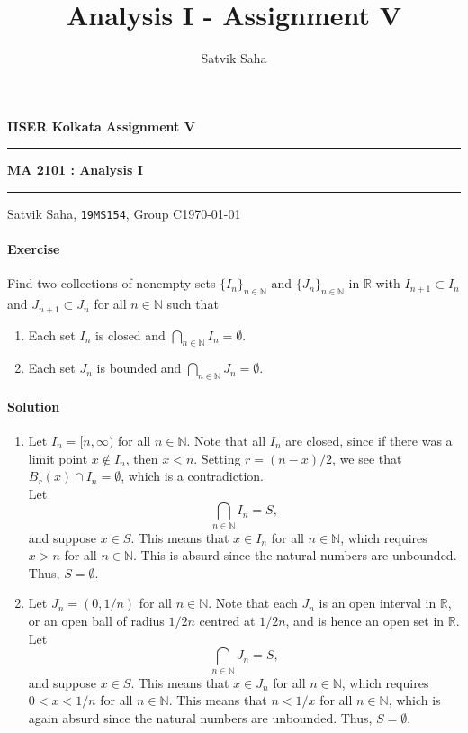 \documentclass[10pt]{article}
\title{Analysis I - Assignment V}
\author{Satvik Saha}
\date{}
\newcounter{prob}
\def\problem{\stepcounter{prob}\paragraph{Exercise \arabic{prob}}}
\def\solution{\paragraph{Solution}}
\begin{document}
        \par\textbf{IISER Kolkata} \hfill \textbf{Assignment V}
        \vspace{3pt}
        \hrule
        \vspace{3pt}
        \begin{center}
                \LARGE{\textbf{MA 2101 : Analysis I}}
        \end{center}
        \vspace{3pt}
        \hrule
        \vspace{3pt}
        Satvik Saha, \texttt{19MS154}, Group C\hfill\today
        \vspace{20pt}

        \problem Find two collections of nonempty sets $\{I_n\}_{n \in \mathbb{N}}$ and $\{J_n\}_{n \in \mathbb{N}}$ in $\mathbb{R}$
        with $I_{n + 1} \subset I_n$ and $J_{n + 1} \subset J_n$ for all $n \in \mathbb{N}$ such that
        \begin{enumerate}
                \item Each set $I_n$ is closed and $\bigcap_{n \in \mathbb{N}} I_n = \emptyset$.
                \item Each set $J_n$ is bounded and $\bigcap_{n \in \mathbb{N}} J_n = \emptyset$.
        \end{enumerate}

        \solution
        \begin{enumerate}
                \item Let $I_n = [n, \infty)$ for all $n \in \mathbb{N}$.
                Note that all $I_n$ are closed, since if there was a limit point $x \notin I_n$, then $x < n$.
                Setting $r = (n - x)/2$, we see that $B_r(x) \cap I_n = \emptyset$, which is a contradiction. \\
                
                Let
                \[
                        \bigcap_{n \in \mathbb{N}} I_n = S,
                \]
                and suppose $x \in S$. This means that $x \in I_n$ for all $n \in \mathbb{N}$, which requires $x > n$ for all $n \in \mathbb{N}$.
                This is absurd since the natural numbers are unbounded. Thus, $S = \emptyset$.

                \item Let $J_n = (0, 1 /n)$ for all $n \in \mathbb{N}$.
                Note that each $J_n$ is an open interval in $\mathbb{R}$, or an open ball of radius $1 /2n$ centred at $1 /2n$, and is hence an 
                open set in $\mathbb{R}$. \\

                Let
                \[
                        \bigcap_{n \in \mathbb{N}} J_n = S,
                \]
                and suppose $x \in S$. This means that $x \in J_n$ for all $n \in \mathbb{N}$, which requires $0 < x < 1 /n$ for all $n \in \mathbb{N}$.
                This means that $n < 1 /x$ for all $n \in \mathbb{N}$, which is again absurd since the natural numbers are unbounded.
                Thus, $S = \emptyset$.
        \end{enumerate}
\end{document}
